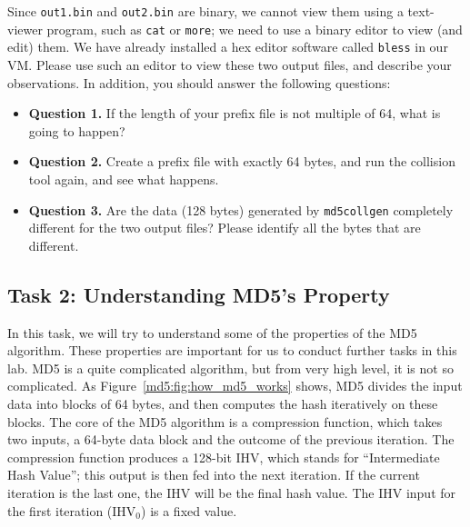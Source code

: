 Since \texttt{out1.bin} and \texttt{out2.bin} are binary, we cannot view them using a text-viewer
program, such as \texttt{cat} or \texttt{more}; 
we need to use a binary editor to view (and edit) them. We have already installed a hex editor software
called \texttt{bless} in our VM. Please use such an editor to view these two output files, and
describe your observations. In addition, you should answer the following questions:


\begin{itemize}[label={--}]
\item \textbf{Question 1.} If the length of your prefix file is not multiple of 64, what is going to
happen?  

\item \textbf{Question 2.} Create a prefix file with exactly 64 bytes, and run the collision tool
again, and see what happens. 

\item \textbf{Question 3.} Are the data (128 bytes) generated by \texttt{md5collgen} completely 
different for the two output files? Please identify all the bytes that are different. 
\end{itemize}
 





\subsection{Task 2: Understanding MD5's Property}


In this task, we will try to understand some of the properties of the
MD5 algorithm. These properties are important for us to conduct further tasks in this lab. 
MD5 is a quite complicated algorithm, but from very high level, it 
is not so complicated. 
As Figure~\ref{md5:fig:how_md5_works} shows, 
MD5 divides the input data into blocks of 64 bytes, and then computes the hash 
iteratively on these blocks. The core of the MD5 algorithm is a compression function, 
which takes two inputs, a 64-byte data block and the
outcome of the previous iteration. The compression function
produces a 128-bit IHV, which stands for ``Intermediate Hash Value'';
this output is then fed into the next iteration. If the current
iteration is the last one, the IHV will be the final hash value. 
The IHV input for the first iteration (IHV$_0$) is a fixed value. 


